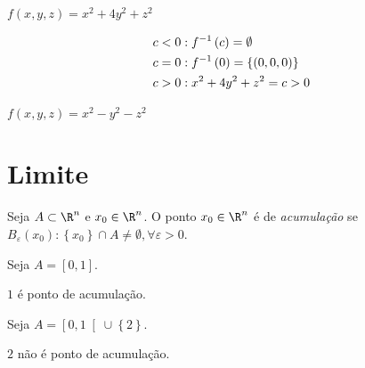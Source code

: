 \documentclass{book}
\begin{document}
\begin{ex}
$f\left( {x,y,z} \right) = x^2  + 4y^2  + z^2$
\end{ex}

\begin{sol}
\[
\begin{gathered}
c < 0:f^{ - 1} \left( c \right) = \emptyset  \hfill \\
  c = 0:f^{ - 1} \left( 0 \right) = \left\{ {\left( {0,0,0} \right)} \right\} \hfill \\
c > 0:x^2  + 4y^2  + z^2  = c > 0 \hfill \\
\end{gathered}
\]


\end{sol}

\begin{ex}
$f\left( {x,y,z} \right) = x^2  - y^2  - z^2$
\end{ex}

\section{Limite} \label{sec10}

\begin{defn}
Seja $A \subset \R^n$ e $x_0 \in \R^n$. O ponto $x_0 \in \R^n$ \'e de \textit{acumula\c c\~ao} se $B_\varepsilon  \left( {x_0 } \right):\left\{ {x_0 } \right\} \cap A \ne \emptyset ,\forall \varepsilon  > 0$.
\end{defn}

\begin{ex}
Seja $A = \left[ {0,1} \right]$.

$1$ \'e ponto de acumula\c c\~ao.

\end{ex}

\begin{ex}
Seja $A = \left[ {0,1} \right[ \cup \left\{ 2 \right\}$.

$2$ n\~ao \'e ponto de acumula\c c\~ao.
\end{ex}
\end{document}
